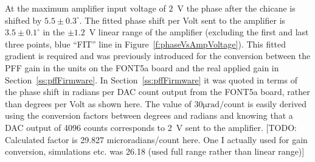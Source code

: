 At the maximum amplifier input voltage of \(2\)~V the phase after the chicane is shifted by \(5.5\pm0.3^\circ\). The fitted phase shift per Volt sent to the amplifier is \(3.5\pm0.1^\circ\) in the \(\pm1.2\)~V linear range of the amplifier (excluding the first and last three points, blue ``FIT'' line in Figure~\ref{f:phaseVsAmpVoltage}). This fitted gradient is required and was previously introduced for the conversion between the PFF gain in the units on the FONT5a board and the real applied gain in Section~\ref{ss:pffFirmware}. In Section~\ref{ss:pffFirmware} it was quoted in terms of the phase shift in radians per DAC count output from the FONT5a board, rather than degrees per Volt as shown here. The value of \(30\mathrm{\mu rad/count}\) is easily derived using the conversion factors between degrees and radians and knowing that a DAC output of 4096 counts corresponds to 2~V sent to the amplifier.
[TODO: Calculated factor is 29.827 microradians/count here. One I actually used for gain conversion, simulations etc. was 26.18 (used full range rather than linear range)]

